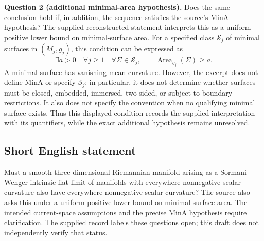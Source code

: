 \documentclass[11pt]{article}
\begin{document}
\textbf{Question 2 (additional minimal-area hypothesis).} Does the same conclusion hold if, in addition, the sequence satisfies the source's \(\mathrm{MinA}\) hypothesis? The supplied reconstructed statement interprets this as a uniform positive lower bound on minimal-surface area. For a specified class \(\mathcal S_j\) of minimal surfaces in \((M_j,g_j)\), this condition can be expressed as
\[
\exists a>0\quad\forall j\geq1\quad\forall\Sigma\in\mathcal S_j,
\qquad \operatorname{Area}_{g_j}(\Sigma)\geq a.
\]
A minimal surface has vanishing mean curvature. However, the excerpt does not define \(\mathrm{MinA}\) or specify \(\mathcal S_j\): in particular, it does not determine whether surfaces must be closed, embedded, immersed, two-sided, or subject to boundary restrictions. It also does not specify the convention when no qualifying minimal surface exists. Thus this displayed condition records the supplied interpretation with its quantifiers, while the exact additional hypothesis remains unresolved.
\subsection{Short English statement}
Must a smooth three-dimensional Riemannian manifold arising as a Sormani--Wenger intrinsic-flat limit of manifolds with everywhere nonnegative scalar curvature also have everywhere nonnegative scalar curvature? The source also asks this under a uniform positive lower bound on minimal-surface area. The intended current-space assumptions and the precise \(\mathrm{MinA}\) hypothesis require clarification. The supplied record labels these questions open; this draft does not independently verify that status.
\end{document}
